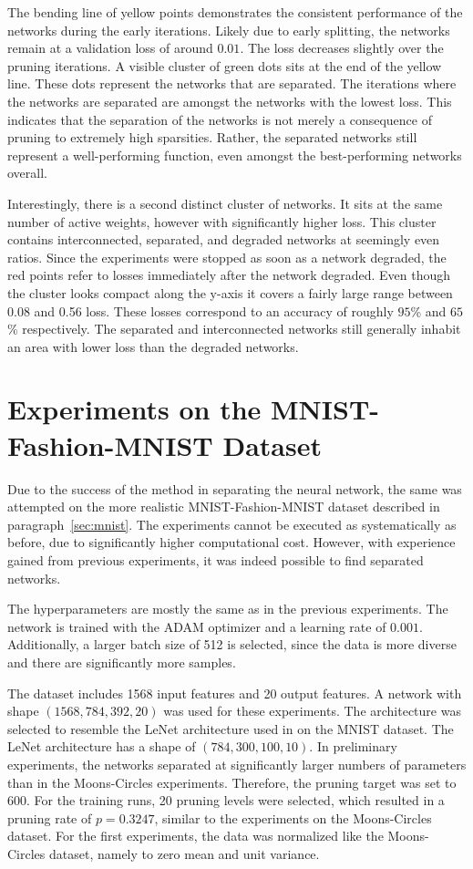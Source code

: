 The bending line of yellow points demonstrates the consistent performance of the networks during the early iterations.
Likely due to early splitting, the networks remain at a validation loss of around $0.01$.
The loss decreases slightly over the pruning iterations.
A visible cluster of green dots sits at the end of the yellow line.
These dots represent the networks that are separated.
The iterations where the networks are separated are amongst the networks with the lowest loss.
This indicates that the separation of the networks is not merely a consequence of pruning to extremely high sparsities.
Rather, the separated networks still represent a well-performing function, even amongst the best-performing networks overall.

Interestingly, there is a second distinct cluster of networks.
It sits at the same number of active weights, however with significantly higher loss.
This cluster contains interconnected, separated, and degraded networks at seemingly even ratios.
Since the experiments were stopped as soon as a network degraded, the red points refer to losses immediately after the network degraded.
Even though the cluster looks compact along the y-axis it covers a fairly large range between 0.08 and 0.56 loss. These losses correspond to an accuracy of roughly $95$\% and $65$\% respectively.
The separated and interconnected networks still generally inhabit an area with lower loss than the degraded networks.

\section{Experiments on the MNIST-Fashion-MNIST Dataset}
Due to the success of the method in separating the neural network, the same was attempted on the more realistic MNIST-Fashion-MNIST dataset described in paragraph~\ref{sec:mnist}.
The experiments cannot be executed as systematically as before, due to significantly higher computational cost.
However, with experience gained from previous experiments, it was indeed possible to find separated networks.

The hyperparameters are mostly the same as in the previous experiments.
The network is trained with the ADAM optimizer and a learning rate of $0.001$.
Additionally, a larger batch size of 512 is selected, since the data is more diverse and there are significantly more samples.

The dataset includes 1568 input features and 20 output features.
A network with shape $(1568, 784, 392, 20)$ was used for these experiments.
The architecture was selected to resemble the LeNet architecture used in \autocite{LTH} on the MNIST dataset.
The LeNet architecture has a shape of $(784, 300, 100, 10)$.
In preliminary experiments, the networks separated at significantly larger numbers of parameters than in the Moons-Circles experiments.
Therefore, the pruning target was set to 600.
For the training runs, 20 pruning levels were selected, which resulted in a pruning rate of $p=0.3247$, similar to the experiments on the Moons-Circles dataset.
For the first experiments, the data was normalized like the Moons-Circles dataset, namely to zero mean and unit variance.

